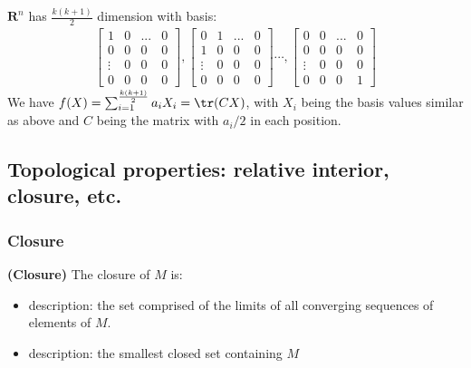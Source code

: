 \documentclass{article}
\newcommand{\bfs}[1]{\textbf{({#1}) }}
\begin{document}
\begin{rema}
$\mathbf{R}^{n}$ has $\frac{k(k+1)}{2}$ dimension with basis:
\begin{align*}
   \begin{bmatrix}
1 & 0 & ... & 0 \\
0 & 0 & 0 & 0 \\
\vdots & 0 & 0 & 0 \\
0 & 0 & 0 & 0 
\end{bmatrix} ,
\begin{bmatrix}
0 & 1 & ... & 0 \\
1 & 0 & 0 & 0 \\
\vdots & 0 & 0 & 0 \\
0 & 0 & 0 & 0 
\end{bmatrix}\cdots,
 \begin{bmatrix}
0 & 0 & ... & 0 \\
0 & 0 & 0 & 0 \\
\vdots & 0 & 0 & 0 \\
0 & 0 & 0 & 1
\end{bmatrix} 
\end{align*}  
We have $f(X)=\sum_{i=1}^{\frac{k(k+1)}{2}}a_i X_i = \tr(CX)$, with $X_i$ being the basis values similar as above and $C$ being the matrix with $a_i/2$ in each position.

\end{rema}

\subsection{Topological properties: relative interior, closure, etc.}
\subsubsection{Closure}
\begin{defa}{\bfs{Closure}}
 The closure of $M$ is:
\begin{itemize}
    \item {} description: the set comprised of the limits of all converging sequences of elements of $M$.
    \item {} description: the smallest closed set containing $M$
\end{itemize}
\end{defa}
\end{document}
